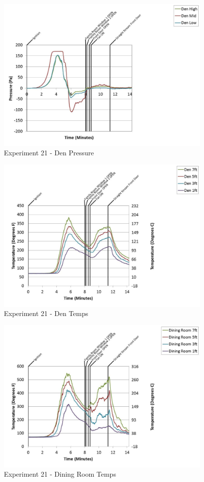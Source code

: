 \documentclass{article}
\begin{document}
\begin{appendices}
	\clearpage

	\begin{figure}[h!]
		\centering
		\includegraphics[height=3.05in]{0_Images/Results_Charts/Exp_21_Charts/DenPressure.pdf}
		\caption{Experiment 21 - Den Pressure}
	\end{figure}
 

	\begin{figure}[h!]
		\centering
		\includegraphics[height=3.05in]{0_Images/Results_Charts/Exp_21_Charts/DenTemps.pdf}
		\caption{Experiment 21 - Den Temps}
	\end{figure}
 
	\clearpage

	\begin{figure}[h!]
		\centering
		\includegraphics[height=3.05in]{0_Images/Results_Charts/Exp_21_Charts/DiningRoomTemps.pdf}
		\caption{Experiment 21 - Dining Room Temps}
	\end{figure}
 


\end{appendices}
\end{document}
